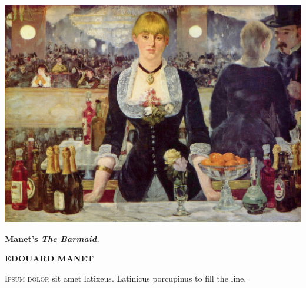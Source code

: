 \documentclass[royal]{octavo}
\begin{document}
   \hskip-0.9cm\includegraphics[width=1.1\textwidth]{manet}\par
    \par\hfill\hfill{\tiny\bfseries Manet's  \textit{The Barmaid.}}\\
    \par
    \vspace*{\baselineskip}
    \par
    \begin{center}
    \noindent\large\bfseries EDOUARD MANET
    \end{center}
    \begin{multicols}{3}
      \lettrine{I}{psum dolor} sit amet latixeus. \lipsum*[1-2]
      Latinicus porcupinus to fill the line.
    \end{multicols}
\clearpage
\end{document}
